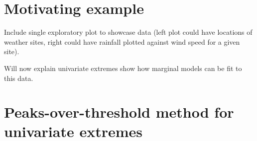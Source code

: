 \documentclass{article}
\numberwithin{equation}{section}
\begin{document}
\section{Motivating example} \label{sec:motivating}




Include single exploratory plot to showcase data (left plot could have locations of weather sites, right could have rainfall plotted against wind speed for a given site).

Will now explain univariate extremes show how marginal models can be fit to this data.

\section{Peaks-over-threshold method for univariate extremes}\label{sec:uni}
\end{document}
